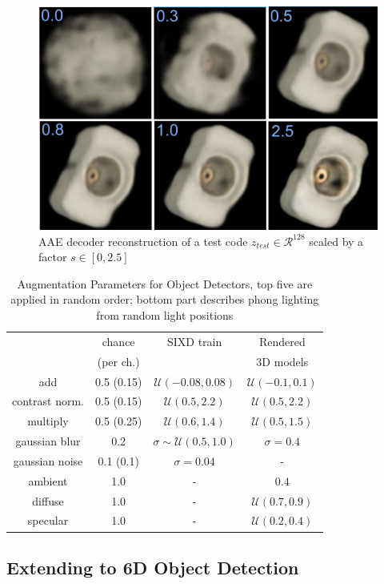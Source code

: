 \begin{figure}[t]%
	\centering
		\captionsetup{width=0.99\columnwidth}
		\includegraphics[width=0.7\columnwidth]{going_along_latent_vector_direction.pdf}
		\caption{\gls{AAE} decoder reconstruction of a test code $z_{test} \in \mathcal{R}^{128}$ scaled by a factor $s\in[0,2.5]$}
		\label{fig:scale}
\end{figure}
\begin{table}[t]
	\scriptsize
	\centering
	\captionsetup{width=0.9\columnwidth}
	\caption{Augmentation Parameters for Object Detectors, top five are applied in random order; bottom part describes phong lighting from random light positions}
	\begin{tabular}{cc|cc}
		\toprule
		&chance & SIXD train & Rendered \\
		&(per ch.)& & 3D models \\
		\midrule
		add & 0.5 (0.15) & $\mathcal{U}(-0.08,0.08)$  &$\mathcal{U}(-0.1,0.1)$ \\
		contrast norm. &0.5 (0.15)& $\mathcal{U}(0.5,2.2)$  &$\mathcal{U}(0.5,2.2)$\\
		multiply & 0.5 (0.25) & $\mathcal{U}(0.6,1.4)$ &$\mathcal{U}(0.5,1.5)$ \\
		gaussian blur & 0.2 & $\sigma \sim \mathcal{U}(0.5,1.0)$  & $\sigma = 0.4$ \\
		gaussian noise & 0.1 (0.1) & $\sigma = 0.04$ & - \\
		\midrule
		ambient & 1.0 & -&$0.4$ \\
		diffuse &1.0&-&$\mathcal{U}(0.7,0.9)$ \\
		specular &1.0&-&$\mathcal{U}(0.2,0.4)$ 
	\end{tabular}
	\label{tab:aug_det}
\end{table}
\subsection{Extending to 6D Object Detection}
